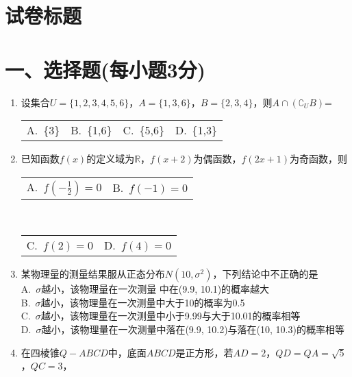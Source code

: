 \documentclass[11pt]{article}
\makeatletter
\newcommand{\onp} [4] { \\
    \begin{tabular} {*{4}{@{}p{3.5cm}}}
        A.~#1 & B.~#2 & C.~#3 & D.~#4
    \end{tabular}
}
\newcommand{\twp} [4] { \\
    \begin{tabular} {*{2}{@{}p{7cm}}}
        A.~#1 & B.~#2
    \end{tabular} \\
    \begin{tabular} {*{2}{@{}p{7cm}}}
        C.~#3 & D.~#4
    \end{tabular}
}
\newcommand{\fop} [4] { \\
    A.~#1 \\
    B.~#2 \\
    C.~#3 \\
    D.~#4
}
\newcommand{\smallpicture}[2]{\texttt{[image: \#1]}}
\newcommand {\pbox} [3] {
    \unitlength=1mm
    \begin{picture} (0, 0)
        \put (#1, #2) {#3}
    \end{picture}
}
\makeatother
\begin{document}
\section*{\centering 试卷标题}
\section*{\normalsize 一、选择题(每小题3分)}
\begin{enumerate}\setcounter{enumi}{0}
    \item 设集合$U=\{1,2,3,4,5,6\}$，$A=\{1,3,6\}$，$B=\{2,3,4\}$，则$A\cap(\complement_UB)$=
    \onp{\{3\}}{\{1,6\}}{\{5,6\}}{\{1,3\}}
    \item 已知函数$f(x)$的定义域为$\mathbb{R}$，$f(x+2)$为偶函数，$f(2x+1)$为奇函数，则
    \twp{$f(-\frac{1}{2})=0$}{$f(-1)=0$}{$f(2)=0$}{$f(4)=0$}
    \item 某物理量的测量结果服从正态分布$N(10, \sigma^2)$，下列结论中不正确的是
    \fop{$\sigma$越小，该物理量在一次测量 中在(9.9, 10.1)的概率越大}
    {$\sigma$越小，该物理量在一次测量中大于10的概率为0.5}
    {$\sigma$越小，该物理量在一次测量中小于9.99与大于10.01的概率相等}
    {$\sigma$越小，该物理量在一次测量中落在(9.9, 10.2)与落在(10, 10.3)的概率相等}
    \item 在四棱锥$Q-ABCD$中，底面$ABCD$是正方形，若$AD=2$，$QD=QA=\sqrt{5}$，$QC=3$，
\end{enumerate}
\end{document}
